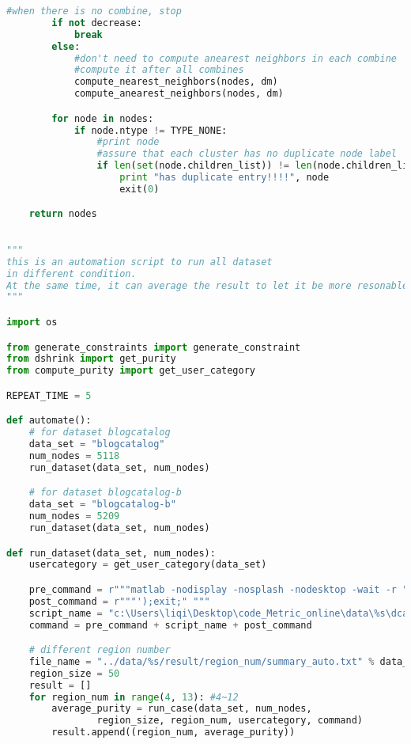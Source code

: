 \begin{lstlisting}[language={python}, caption={DSHRINK算法}, label=code:dshrink]
        #when there is no combine, stop
        if not decrease:
            break
        else:
            #don't need to compute anearest neighbors in each combine
            #compute it after all combines
            compute_nearest_neighbors(nodes, dm)
            compute_anearest_neighbors(nodes, dm)

        for node in nodes:
            if node.ntype != TYPE_NONE:
                #print node
                #assure that each cluster has no duplicate node label
                if len(set(node.children_list)) != len(node.children_list):
                    print "has duplicate entry!!!!", node
                    exit(0)

    return nodes
\end{lstlisting}

\begin{lstlisting}[language={python}, caption={自动化脚本}, label=code:auto]

"""
this is an automation script to run all dataset
in different condition.
At the same time, it can average the result to let it be more resonable
"""

import os

from generate_constraints import generate_constraint
from dshrink import get_purity
from compute_purity import get_user_category

REPEAT_TIME = 5

def automate():
    # for dataset blogcatalog
    data_set = "blogcatalog"
    num_nodes = 5118
    run_dataset(data_set, num_nodes)

    # for dataset blogcatalog-b
    data_set = "blogcatalog-b"
    num_nodes = 5209
    run_dataset(data_set, num_nodes)

def run_dataset(data_set, num_nodes):
    usercategory = get_user_category(data_set)

    pre_command = r"""matlab -nodisplay -nosplash -nodesktop -wait -r "run('"""
    post_command = r"""');exit;" """
    script_name = "c:\Users\liqi\Desktop\code_Metric_online\data\%s\dca_distance.m" % data_set
    command = pre_command + script_name + post_command

    # different region number
    file_name = "../data/%s/result/region_num/summary_auto.txt" % data_set
    region_size = 50
    result = []
    for region_num in range(4, 13): #4~12
        average_purity = run_case(data_set, num_nodes,
                region_size, region_num, usercategory, command)
        result.append((region_num, average_purity))


\end{lstlisting}
